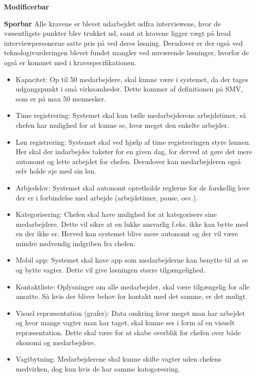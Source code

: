 \textbf{Modificerbar}


\textbf{Sporbar}
Alle kravene er blevet udarbejdet udfra interviewene, hvor de væsentligste punkter blev trukket ud, samt at kravene ligger vægt på hvad interviewpersonerne satte pris på ved deres løsning. Derudover er der også ved teknologivurderingen blevet fundet mangler ved nuværende løsninger, hvorfor de også er kommet med i kravsspecifikationen.

\begin{itemize}
    \item Kapacitet: Op til 50 medarbejdere, skal kunne være i systemet, da der tages udgangspunkt i små virksomheder. Dette kommer af definitionen på SMV, som er på max 50 mennesker.
    \item Time registrering: Systemet skal kun tælle medarbejderens arbejdstimer, så chefen har mulighed for at kunne se, hvor meget den enkelte arbejder.
    \item Løn registrering: 
Systemet skal ved hjælp af time registreringen styre lønnen. Her skal der indarbejdes takster for en given dag, for derved at gøre det mere autonomt og lette arbejdet for chefen. Derudover kan medarbejderen også selv holde øje med sin løn.
    \item Arbjedslov: Systemet skal autonomt opretholde reglerne for de forskellig love der er i forbindelse med arbejde (arbejdstimer, pause, osv.). %
    \item Kategorisering: Chefen skal have mulighed for at kategorisere sine medarbejdere. Dette vil sikre at en lukke ansvarlig f.eks. ikke kan bytte med en der ikke er. Herved kan systemet blive mere autonomt og der vil være mindre nødvendig indgriben fra chefen.
    \item Mobil app: Systemet skal have app som medarbejderne kan benytte til at se og bytte vagter. Dette vil give løsningen større tilgængelighed.
    \item Kontaktliste: Oplysninger om alle medarbejder, skal være tilgængelig for alle ansatte. Så hvis der bliver behov for kontakt med det samme, er det muligt.
    \item Visuel repræsentation (grafer): Data omkring hvor meget man har arbejdet og hvor mange vagter man har taget, skal kunne ses i form af en visuelt repræsentation. Dette skal være for at skabe overblik for chefen over både økonomi og medarbejdere. 
    \item Vagtbytning: Medarbejderene skal kunne skifte vagter uden chefens medvirken, dog kun hvis de har samme katogoresring.

\end{itemize}
